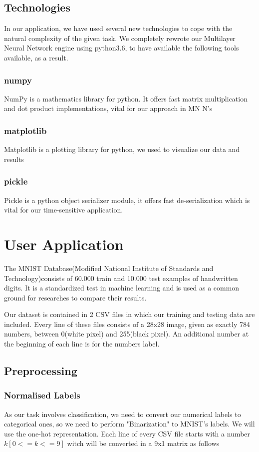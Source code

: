 \documentclass{proc}
\begin{document}
	\subsection{Technologies}
	In our application, we have used several new technologies to cope with the natural complexity of the given task. We completely rewrote our Multilayer Neural Network engine using python3.6, to have available the following tools available, as a result.
	\subsubsection{numpy}
	NumPy is a mathematics library for python. It offers fast matrix multiplication and dot product implementations, vital for our approach in MN N's
	\subsubsection{matplotlib}
	Matplotlib is a plotting library for python, we used to visualize our data and results
	\subsubsection{pickle}
	Pickle is a python object serializer module, it offers fast de-serialization which is vital for our time-sensitive application.	
	\section{User Application}
	The MNIST Database(Modified National Institute of Standards and Technology)consists of 60.000 train and 10.000 test examples of handwritten digits. It is a standardized test in machine learning and is used as a common ground for researches to compare their results.
	
	Our dataset is contained in 2 CSV files in which our training and testing data are included. Every line of these files consists of a 28x28 image, given as exactly 784 numbers, between 0(white pixel) and 255(black pixel). An additional number at the beginning of each line is for the numbers label.
	\subsection{Preprocessing}
	\subsubsection{Normalised Labels}
	As our task involves classification, we need to convert our numerical labels to categorical ones, so we need to perform "Binarization" to MNIST's labels. We will use the one-hot representation. Each line of every CSV file starts with a number ${k[0<=k<=9]}$ witch will be converted in a 9x1 matrix as follows
	
\end{document}
